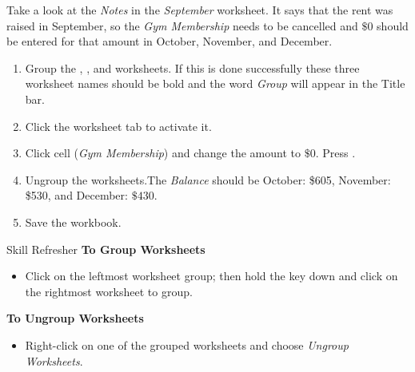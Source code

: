 Take a look at the \textit{Notes} in the \textit{September} worksheet. It says that the rent was raised in September, so the \textit{Gym Membership} needs to be cancelled and $ \$0 $ should be entered for that amount in October, November, and December.

\begin{enumerate}
	\item Group the , , and  worksheets. If this is done successfully these three worksheet names should be bold and the word \textit{Group} will appear in the Title bar.
	\item Click the  worksheet tab to activate it.
	\item Click cell  (\textit{Gym Membership}) and change the amount to $ \$0 $. Press .
	\item Ungroup the worksheets.The \textit{Balance} should be October: \$605, November: \$530, and December: $ \$430 $.
	\item Save the  workbook.
\end{enumerate}

\begin{center}
	\begin{sklbox}{Skill Refresher}
		\textbf{To Group Worksheets}
		\\
		\begin{itemize}
			\setlength{\itemsep}{0pt}
			\setlength{\parskip}{0pt}
			\setlength{\parsep}{0pt}
			
			\item Click on the leftmost worksheet group; then hold the  key down and click on the rightmost worksheet to group.
		\end{itemize}
			
		\bigskip
			
		\textbf{To Ungroup Worksheets}
		\begin{itemize}
			\setlength{\itemsep}{0pt}
			\setlength{\parskip}{0pt}
			\setlength{\parsep}{0pt}
			
			\item Right-click on one of the grouped worksheets and choose \textit{Ungroup Worksheets}.
		\end{itemize}
	\end{sklbox}
\end{center}

